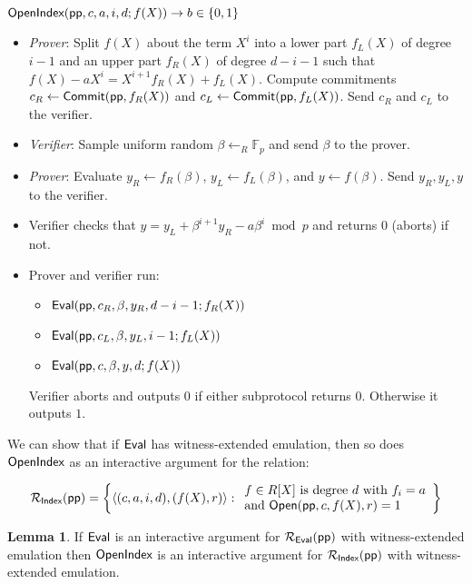 \documentclass{article}
\theoremstyle{definition}
\newtheorem{lemma}{Lemma}
\begin{document}
$\textsf{{OpenIndex}}(\textsf{pp}, c, a, i, d; f(X)) \rightarrow b \in \{0,1\}$
\begin{itemize}

\item \emph{Prover}: Split $f(X)$ about the term $X^i$ into a lower part $f_L(X)$ of degree $i -1$ and an upper part $f_R(X)$ of degree $d - i - 1$ such that $f(X) - a X^i = X^{i+1} f_R(X) + f_L(X)$. Compute commitments $c_R \leftarrow \textsf{{Commit}}(\textsf{pp}, f_R(X))$ and $c_L \leftarrow \textsf{{Commit}}(\textsf{pp}, f_L(X))$. Send $c_R$ and $c_L$ to the verifier. 

\item \emph{Verifier}: Sample uniform random  $\beta \leftarrow_R \mathbb{F}_p$ and send $\beta$ to the prover.

\item \emph{Prover}: Evaluate $y_R \leftarrow f_R(\beta)$, $y_L \leftarrow f_L(\beta)$, and $y \leftarrow f(\beta)$. Send $y_R, y_L, y$ to the verifier. 

\item Verifier checks that $y = y_L + \beta^{i+1} y_R - a \beta^i \bmod p$ and returns $0$ (aborts) if not.

\item Prover and verifier run: 
\begin {itemize} 
\item  $\textsf{{Eval}}(\textsf{pp}, c_R, \beta, y_R, d - i -1; f_R(X))$ 
\item $\textsf{{Eval}}(\textsf{pp}, c_L, \beta, y_L, i -1; f_L(X))$ 
\item $\textsf{{Eval}}(\textsf{pp}, c, \beta, y, d; f(X))$
\end{itemize} 
Verifier aborts and outputs $0$ if either subprotocol returns $0$. Otherwise it outputs $1$. 

\end{itemize}

We can show that if $\textsf{{Eval}}$ has witness-extended emulation, then so does $\textsf{{OpenIndex}}$ as an interactive argument for the relation: 

\[ 
\mathcal{R_\textsf{Index}}(\textsf{pp}) = \left\{
\langle (c, a, i, d), (f(X), r) \rangle
: 
\begin{array}{l} 
f \in R[X] \ \text{is degree} \ d \ \text{with} \ f_i = a \\ 
 \text{and} \ \textsf{{Open}}(\textsf{pp}, c, f(X), r) = 1 \\
\end{array}
\right\}
\] 


\begin{lemma} 
If $\textsf{{Eval}}$ is an interactive argument for $\mathcal{R_\textsf{Eval}}(\textsf{pp})$ with witness-extended emulation then $\textsf{{OpenIndex}}$ is an interactive argument for $\mathcal{R_\textsf{Index}}(\textsf{pp})$ with witness-extended emulation. 
\end{lemma}
\end{document}
